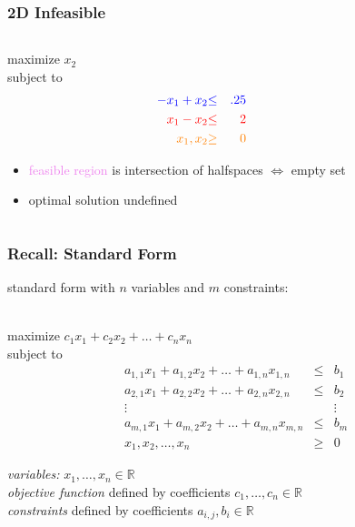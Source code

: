 \documentclass{beamer}
\newcommand{\stanza}{ \\~\ }
\begin{document}
\begin{frame} \frametitle{2D Infeasible}
  \begin{columns}
    \begin{column}{0.4 \textwidth}
  maximize $x_2$ \\
  subject to
  \begin{eqnarray*}
    \textcolor{blue}{-x_1 + x_2} &\textcolor{blue}{\leq}& \textcolor{blue}{.25} \\
    \textcolor{red}{x_1 - x_2} &\textcolor{red}{\leq}& \textcolor{red}{2} \\
    \textcolor{orange}{x_1, x_2} &\textcolor{orange}{\geq}& \textcolor{orange}{0}
  \end{eqnarray*}
  \begin{itemize}
    \item \textcolor{violet}{feasible region} is intersection of halfspaces
     $\Leftrightarrow$ empty set
    \item optimal solution undefined
  \end{itemize}
  \end{column}
  \begin{column}{0.6 \textwidth}
    \begin{center}
  \end{center}
\end{column}
\end{columns}
\end{frame}

\begin{frame} \frametitle{Recall: Standard Form}
standard form with $n$ variables and $m$ constraints:\stanza

maximize $c_1 x_1 + c_2 x_2 + \ldots + c_n x_n$ \\
subject to
\begin{eqnarray*}
a_{1,1} x_1 + a_{1,2} x_2 + \ldots + a_{1, n} x_{1, n} &\leq& b_1 \\
a_{2,1} x_1 + a_{2,2} x_2 + \ldots + a_{2, n} x_{2, n} &\leq& b_2 \\
\vdots & & \vdots \\
a_{m,1} x_1 + a_{m,2} x_2 + \ldots + a_{m, n} x_{m, n} &\leq& b_m \\
x_1, x_2, \ldots, x_n &\geq& 0
\end{eqnarray*}

\emph{variables:} $x_1, \ldots, x_n \in \mathbb{R}$ \\
\emph{objective function} defined by coefficients $c_1, \ldots, c_n \in \mathbb{R}$ \\
\emph{constraints} defined by coefficients $a_{i,j}, b_i \in \mathbb{R}$
\end{frame}
\end{document}
